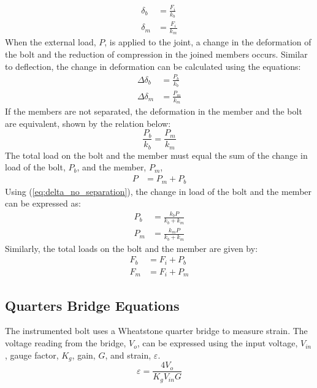 \begin{align}
    \delta_b &= \frac{F_i}{k_b} \label{eq:delta_b} \\
    \delta_m &= \frac{F_i}{k_m} \label{eq:delta_m}
\end{align}
When the external load, $P$, is applied to the joint, a change in the deformation of the bolt and the reduction of compression in the joined members occurs. Similar to deflection, the change in deformation can be calculated using the equations:
\begin{align}
    \Delta \delta_b &= \frac{P_b}{k_b} \label{eq:delta_delta_b} \\
    \Delta \delta_m &= \frac{P_m}{k_m} \label{eq:delta_delta_m}
\end{align}
If the members are not separated, the deformation in the member and the bolt are equivalent, shown by the relation below:
\begin{equation}
    \frac{P_b}{k_b} = \frac{P_m}{k_m} \label{eq:delta_no_separation}
\end{equation}
The total load on the bolt and the member must equal the sum of the change in load of the bolt, $P_b$, and the member, $P_m$, 
\begin{align*}
    P &= P_m + P_b 
\end{align*}
Using (\ref{eq:delta_no_separation}), the change in load of the bolt and the member can be expressed as:
\begin{align}
    P_b &= \frac{k_bP}{k_b+k_m} \label{eq:P_b} \\
    P_m &= \frac{k_mP}{k_b+k_m} \label{eq:P_m}
\end{align}
Similarly, the total loads on the bolt and the member are given by:
\begin{align}
    F_b &= F_i + P_b \label{eq:F_b} \\
    F_m &= F_i + P_m \label{eq:F_m}
\end{align}

\subsection{Quarters Bridge Equations}
The instrumented bolt uses a Wheatstone quarter bridge to measure strain. The voltage reading from the bridge, $V_o$, can be expressed using the input voltage, $V_{in}$, gauge factor, $K_g$, gain, $G$, and strain, $\varepsilon$.
\begin{equation}
    \varepsilon = \frac{4V_o}{K_gV_{in}G} \label{eq:strain_bridge}
\end{equation}

